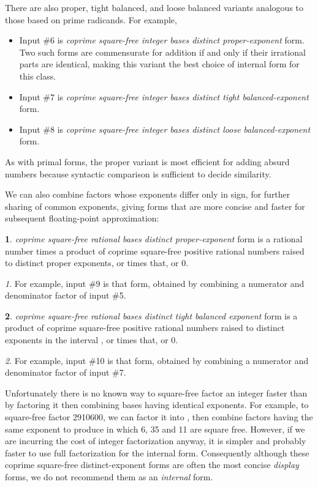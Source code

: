 \documentclass[12pt,english]{article}
\theoremstyle{definition}
\newtheorem*{defn*}{\protect\definitionname}
\theoremstyle{remark}
\newtheorem*{rem*}{\protect\remarkname}
\theoremstyle{plain}
\theoremstyle{plain}
\providecommand{\definitionname}{Definition}
\providecommand{\remarkname}{Remark}
\begin{document}
There are also proper, tight balanced, and loose balanced variants
analogous to those based on prime radicands. For example,
\begin{itemize}
\item Input \#6 is\textsl{ coprime square-free integer bases distinct proper-exponent}
form. Two such forms are commensurate for addition if and only if
their irrational parts are identical, making this variant the best
choice of internal form for this class. 
\item Input \#7 is \textsl{coprime square-free integer bases distinct tight
balanced-exponent} form.
\item Input \#8 is \textsl{coprime square-free integer bases distinct loose
balanced-exponent} form.
\end{itemize}
As with primal forms, the proper variant is most efficient for adding
absurd numbers because syntactic comparison is sufficient to decide
similarity.

We can also combine factors whose exponents differ only in sign, for
further sharing of common exponents, giving forms that are more concise
and faster for subsequent floating-point approximation:
\begin{defn*}
\textsl{coprime square-free rational bases distinct proper-exponent
}form is a rational number times a product of coprime square-free
positive rational numbers raised to distinct proper exponents, or
{\small } times that, or 0.\end{defn*}
\begin{rem*}
For example, input \#9 is that form, obtained by combining a numerator
and denominator factor of input \#5.\end{rem*}
\begin{defn*}
\textsl{coprime square-free rational bases distinct tight balanced
exponent }form is a product of coprime square-free positive rational
numbers raised to distinct exponents in the interval ,
or {\small } times that, or 0.\end{defn*}
\begin{rem*}
For example, input \#10 is that form, obtained by combining a numerator
and denominator factor of input \#7.
\end{rem*}
Unfortunately there is no known way to square-free factor an integer
faster than by factoring it then combining bases having identical
exponents. For example, to square-free factor 2910600, we can factor
it into , then combine factors having
the same exponent to produce  in which 6, 35 and
11 are square free. However, if we are incurring the cost of integer
factorization anyway, it is simpler and probably faster to use full
factorization for the internal form. Consequently although these coprime
square-free distinct-exponent forms are often the most concise \textsl{display}
forms, we do not recommend them as an \textsl{internal} form.
\end{document}
